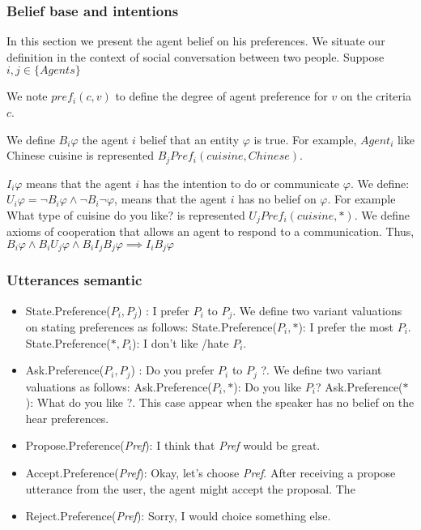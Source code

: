 \documentclass{llncs}
\begin{document}
\subsubsection{Belief base and intentions}
In this section we present the agent belief on his preferences. We situate our definition in the context of social conversation between two people. Suppose $i,j \in \{Agents\}$
\par We note $pref_{i} (c,v)$ to define the degree of agent preference for $v$ on the criteria $c$.

 We define $ B_{i} \varphi$ the agent $i$  belief that an entity $\varphi$ is true. For example, $Agent_{i}$ like Chinese cuisine is represented $ B_{j} Pref_{i}(cuisine, Chinese)$.
 
  $I_{i} \varphi$ means that the agent $i$ has the intention to do or communicate $\varphi$. We define: $U_{i} \varphi = \neg B_{i} \varphi \land \neg B_{i} \neg \varphi$, means that the agent $i$ has no belief on $\varphi$. For example What type of cuisine do you like? is represented $U_{j} Pref_{i}(cuisine,*)$. We define axioms of cooperation that allows an agent to respond to a communication. Thus, $ B_{i} \varphi \land  B_{i} U_{j} \varphi \land  B_{i} I_{j}  B_{j} \varphi \implies I_{i}  B_{j} \varphi  $
 
\subsubsection{Utterances semantic}

 \begin{itemize}
 \item State.Preference(\textit{$P_{i}, P_{j}$}) : I prefer $P_{i}$ to $P_{j}$. We define two variant valuations on stating preferences as follows: 
 \subitem State.Preference(\textit{$P_{i}, *$}): I prefer the most $P_{i}$.
 \subitem State.Preference(\textit{$*, P_{i}$}): I don't like /hate $P_{i}$.

 \item Ask.Preference(\textit{$P_{i}, P_{j}$}) : Do you prefer $P_{i}$ to $P_{j}$ ?. We define two variant valuations as follows: 
 \subitem Ask.Preference(\textit{$P_{i}, *$}): Do you like $P_{i}$?
 \subitem Ask.Preference(\textit{$*$}): What do you like ?. This case appear when the speaker has no belief on the hear preferences. 
 
 \item Propose.Preference(\textit{Pref}): I think that \textit{Pref} would be great.
  
 \item Accept.Preference(\textit{Pref}): Okay, let's choose \textit{Pref}. After receiving a propose utterance from the user, the agent might accept the proposal. The 
 \item Reject.Preference(\textit{Pref}): Sorry, I would choice something else.
 \end{itemize} 
\end{document}
